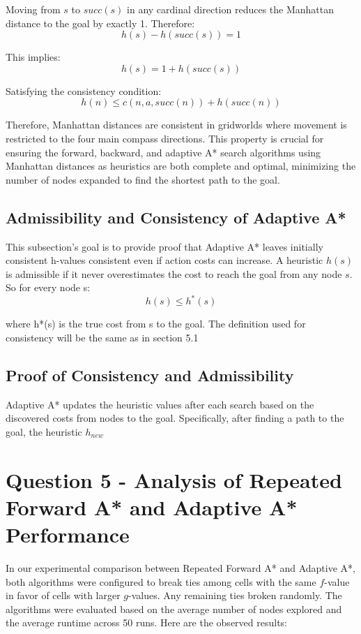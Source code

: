\documentclass{article}
\begin{document}
Moving from \(s\) to \(succ(s)\) in any cardinal direction reduces the Manhattan distance to the goal by exactly 1. Therefore:
\[h(s) - h(succ(s)) = 1\]

This implies:
\[h(s) = 1 + h(succ(s))\]

Satisfying the consistency condition:
\[h(n) \leq c(n, a, succ(n)) + h(succ(n))\]

Therefore, Manhattan distances are consistent in gridworlds where movement is restricted to the four main compass directions. This property is crucial for ensuring the forward, backward, and adaptive A* search algorithms using Manhattan distances as heuristics are both complete and optimal, minimizing the number of nodes expanded to find the shortest path to the goal.

\subsection{Admissibility and Consistency of Adaptive A*}
This subsection's goal is to provide proof that  Adaptive A* leaves initially consistent h-values consistent even if action costs can increase.  A heuristic \(h(s)\) is admissible if it never overestimates the cost to reach the goal from any node \(s\). So for every node s: \[h(s) \leq h^*(s)\]

where h*(s) is the true cost from s to the goal. The definition used for consistency will be the same as in section 5.1

\subsection{Proof of Consistency and Admissibility}
Adaptive A* updates the heuristic values after each search based on the discovered costs from nodes to the goal. Specifically, after finding a path to the goal, the heuristic $h_{new}$


\section{Question 5 - Analysis of Repeated Forward A* and Adaptive A* Performance}
In our experimental comparison between Repeated Forward A* and Adaptive A*, both algorithms were configured to break ties among cells with the same \(f\)-value in favor of cells with larger \(g\)-values. Any remaining ties broken randomly. The algorithms were evaluated based on the average number of nodes explored and the average runtime across 50 runs. Here are the observed results:
\end{document}
